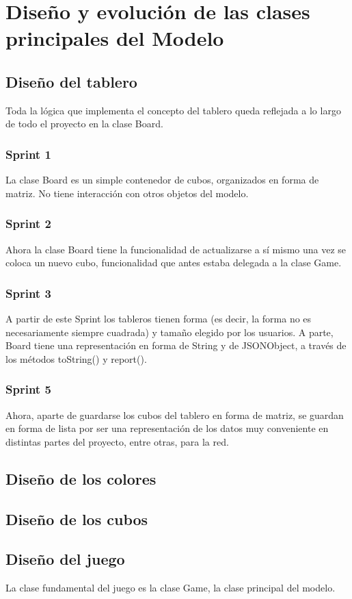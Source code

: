 \documentclass{article}
\theoremstyle{break}
\begin{document}
\graphicspath{{fotos/}}
\section{Diseño y evolución de las clases principales del Modelo}
\subsection{Diseño del tablero}
Toda la lógica que implementa el concepto del tablero queda reflejada a lo largo de todo el proyecto en la clase Board.
\subsubsection{Sprint 1}
La clase Board es un simple contenedor de cubos, organizados en forma de matriz.
No tiene interacción con otros objetos del modelo.
\subsubsection{Sprint 2}
Ahora la clase Board tiene la funcionalidad de actualizarse a sí mismo una vez se coloca un nuevo cubo, funcionalidad que antes estaba delegada a la clase Game.
\subsubsection{Sprint 3}
A partir de este Sprint los tableros tienen forma (es decir, la forma no es necesariamente siempre cuadrada) y tamaño elegido por los usuarios. A parte, Board tiene una representación en forma de String y de JSONObject, a través de los métodos toString() y report().
\subsubsection{Sprint 5}
Ahora, aparte de guardarse los cubos del tablero en forma de matriz, se guardan en forma de lista por ser una representación de los datos muy conveniente en distintas partes del proyecto, entre otras, para la red.

\subsection{Diseño de los colores}

\subsection{Diseño de los cubos}

\subsection{Diseño del juego}
La clase fundamental del juego es la clase Game, la clase principal del modelo.
\end{document}
